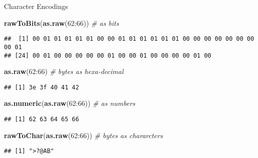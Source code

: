 \documentclass[ignorenonframetext,]{beamer}
\newenvironment{Shaded}{\begin{snugshade}}{\end{snugshade}}
\newcommand{\KeywordTok}[1]{\textcolor[rgb]{0.13,0.29,0.53}{\textbf{{#1}}}}
\newcommand{\DecValTok}[1]{\textcolor[rgb]{0.00,0.00,0.81}{{#1}}}
\newcommand{\CommentTok}[1]{\textcolor[rgb]{0.56,0.35,0.01}{\textit{{#1}}}}
\newcommand{\NormalTok}[1]{{#1}}
\begin{document}
\begin{frame}[fragile]{Character Encodings}

\begin{Shaded}
\begin{Highlighting}[]
\KeywordTok{rawToBits}\NormalTok{(}\KeywordTok{as.raw}\NormalTok{(}\DecValTok{62}\NormalTok{:}\DecValTok{66}\NormalTok{)) }\CommentTok{# as bits}
\end{Highlighting}
\end{Shaded}

\begin{verbatim}
##  [1] 00 01 01 01 01 01 00 00 01 01 01 01 01 01 00 00 00 00 00 00 00 00 01
## [24] 00 01 00 00 00 00 00 01 00 00 01 00 00 00 00 01 00
\end{verbatim}

\begin{Shaded}
\begin{Highlighting}[]
\KeywordTok{as.raw}\NormalTok{(}\DecValTok{62}\NormalTok{:}\DecValTok{66}\NormalTok{) }\CommentTok{# bytes as hexa-decimal}
\end{Highlighting}
\end{Shaded}

\begin{verbatim}
## [1] 3e 3f 40 41 42
\end{verbatim}

\begin{Shaded}
\begin{Highlighting}[]
\KeywordTok{as.numeric}\NormalTok{(}\KeywordTok{as.raw}\NormalTok{(}\DecValTok{62}\NormalTok{:}\DecValTok{66}\NormalTok{)) }\CommentTok{# as numbers}
\end{Highlighting}
\end{Shaded}

\begin{verbatim}
## [1] 62 63 64 65 66
\end{verbatim}

\begin{Shaded}
\begin{Highlighting}[]
\KeywordTok{rawToChar}\NormalTok{(}\KeywordTok{as.raw}\NormalTok{(}\DecValTok{62}\NormalTok{:}\DecValTok{66}\NormalTok{)) }\CommentTok{# bytes as chararcters}
\end{Highlighting}
\end{Shaded}

\begin{verbatim}
## [1] ">?@AB"
\end{verbatim}

\end{frame}
\end{document}
